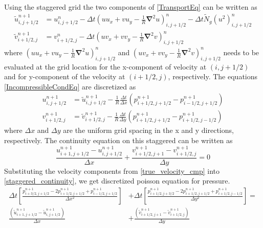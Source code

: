 \documentclass[12pt]{report}   %
\newcommand{\grad}{\mathbf{\nabla}}
\newcommand{\Ndg}{\tilde{N}_g}
\begin{document}
Using the staggered grid the two components of \eqref{TransportEq} can be written as
\begin{equation}
\begin{split}
 \tilde{u}_{i,j+1/2}^{n+1} &= u_{i,j+1/2}^n - \Delta t \left(u u_x + vu_y -\frac{1}{R}\grad^2u \right)_{i,j+1/2}^n -\Delta t\Ndg (u^2)_{i,j+1/2}^n\\
 \tilde{v}_{i+1/2,j}^{n+1} &= v_{i+1/2,j}^n - \Delta t \left(u v_x + vv_y -\frac{1}{R}\grad^2v \right)_{i,j+1/2}^n
\end{split}
\end{equation}
where $\left(u u_x + vu_y -\frac{1}{R}\grad^2u \right)_{i,j+1/2}^n$ and $\left(u v_x + vv_y -\frac{1}{R}\grad^2v \right)_{i,j+1/2}^n$
needs to be evaluated at the grid location for the x-component of velocity at $(i,j+1/2)$ and for y-component of the velocity at $(i+1/2,j)$, respectively. The equations \eqref{IncompressibleCondEq} are discretized as 
\begin{equation}
\begin{split}
 u^{n+1}_{i,j+1/2} &= \tilde{u}^{n+1}_{i,j+1/2} -\frac{1}{R} \frac{\Delta t}{\Delta x} \left(p_{i+1/2,j+1/2}^{n+1} -p_{i-1/2,j+1/2}^{n+1} \right)\\
 v^{n+1}_{i+1/2,j} &= \tilde{v}^{n+1}_{i+1/2,j} -\frac{1}{R} \frac{\Delta t}{\Delta y} \left(p_{i+1/2,j+1/2}^{n+1} -p_{i+1/2,j-1/2}^{n+1} \right)
 \end{split}
 \label{true_velocity_cmp}
\end{equation}
where $\Delta x$ and $\Delta y$ are the uniform grid spacing in the x and y directions, respectively. The continuity equation on this staggered can be written as 
\begin{equation}
 \frac{ u_{i+1,j+1/2}^{n+1}-u_{i,j+1/2}^{n+1} }{ \Delta x } +\frac{v_{i+1/2,j+1}^{n+1}-v_{i+1/2,j}^{n+1} }{\Delta y} = 0
 \label{staggered_continuity}
 \end{equation}
Substituting the velocity components from \eqref{true_velocity_cmp} into \eqref{staggered_continuity}, we get discretized poisson equation for pressure.
\begin{equation}
\begin{split}
  \Delta t \left[\frac{p_{i+3/2,j+1/2}^{n+1}-2p_{i+1/2,j+1/2}^{n+1}+p_{i-1/2,j+1/2}^{n+1}}{\Delta x^2} \right] &+
 \Delta t \left[ \frac{p_{i+1/2,j+3/2}^{n+1}-2p_{i+1/2,j+1/2}^{n+1}+p_{i+1/2,j-1/2}^{n+1}}{\Delta y^2}   \right] = \\
 \frac{\left(\tilde{u}_{i+1,j+1/2}^{n+1}-
  \tilde{u}_{i,j+1/2}^{n+1}  \right) }{\Delta x}&+\frac{\left(\tilde{v}_{i+1/2,j+1}^{n+1}-\tilde{v}_{i+1/2,j}^{n+1}  \right)}{\Delta y}
\end{split}
\label{pressure_equation}
\end{equation}
\end{document}

